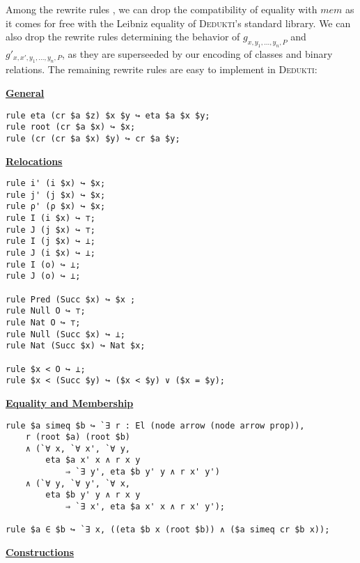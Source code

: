 \documentclass[submission,copyright,creativecommons]{eptcs}
\newcommand{\dedukti}{\textsc{Dedukti}}
\begin{document}
Among the rewrite rules \cite[see Table 3]{zermodulo}, we can drop the compatibility of equality with $mem$ as it comes for free with the Leibniz equality of \dedukti's standard library. We can also drop the rewrite rules determining the behavior of $g_{x,y_1,...,y_n,P}$ and $g'_{x,x',y_1,...,y_n,P}$, as they are superseeded by our encoding of classes and binary relations. The remaining rewrite rules are easy to implement in \dedukti:
\filbreak
\begin{center}
\underline{\textbf{General}}
\end{center}
\begin{lstlisting}
rule eta (cr $a $z) $x $y ↪ eta $a $x $y;
rule root (cr $a $x) ↪ $x;
rule (cr (cr $a $x) $y) ↪ cr $a $y;
\end{lstlisting}
\filbreak
\begin{center}
\underline{\textbf{Relocations}}
\end{center}
\begin{lstlisting}
rule i' (i $x) ↪ $x;
rule j' (j $x) ↪ $x;
rule ρ' (ρ $x) ↪ $x;
rule I (i $x) ↪ ⊤;
rule J (j $x) ↪ ⊤;
rule I (j $x) ↪ ⊥;
rule J (i $x) ↪ ⊥;
rule I (o) ↪ ⊥;
rule J (o) ↪ ⊥;

rule Pred (Succ $x) ↪ $x ;
rule Null O ↪ ⊤;
rule Nat O ↪ ⊤;
rule Null (Succ $x) ↪ ⊥;
rule Nat (Succ $x) ↪ Nat $x;

rule $x < O ↪ ⊥;
rule $x < (Succ $y) ↪ ($x < $y) ∨ ($x = $y);
\end{lstlisting}
\filbreak
\begin{center}
\underline{\textbf{Equality and Membership}}
\end{center}
\begin{lstlisting}
rule $a simeq $b ↪ `∃ r : El (node arrow (node arrow prop)), 
    r (root $a) (root $b)
    ∧ (`∀ x, `∀ x', `∀ y, 
        eta $a x' x ∧ r x y
            ⇒ `∃ y', eta $b y' y ∧ r x' y')
    ∧ (`∀ y, `∀ y', `∀ x, 
        eta $b y' y ∧ r x y
            ⇒ `∃ x', eta $a x' x ∧ r x' y');

rule $a ∈ $b ↪ `∃ x, ((eta $b x (root $b)) ∧ ($a simeq cr $b x));
\end{lstlisting}
\filbreak
\begin{center}
\underline{\textbf{Constructions}}
\end{center}
\end{document}
